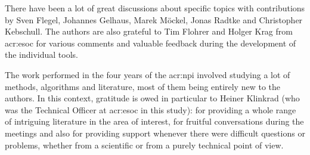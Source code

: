 There have been a lot of great discussions about specific topics with contributions by Sven Flegel, Johannes Gelhaus, Marek M\"ockel, Jonas Radtke and Christopher
Kebschull. The authors are also grateful to Tim Flohrer and Holger Krag from \gls{acr:esoc} for various comments and valuable feedback during the development of the individual
tools.

The work performed in the four years of the \gls{acr:npi} involved studying a lot of methods, algorithms and literature, most of them being entirely new to the authors. In this
context, gratitude is owed in particular to Heiner Klinkrad (who was the Technical Officer at \gls{acr:esoc} in this study): for providing a whole range of intriguing literature in
the area of interest, for fruitful conversations during the meetings and also for providing support whenever there were difficult questions or problems, whether from a scientific
or from a purely technical point of view.